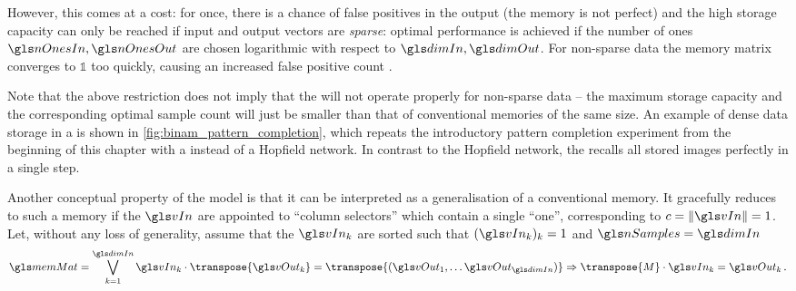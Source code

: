 However, this comes at a cost: for once, there is a chance of false positives in the output (the memory is not perfect) and the high storage capacity can only be reached if input and output vectors are \emph{sparse}: optimal performance is achieved if the number of ones $\nOnesIn, \nOnesOut$ are chosen logarithmic with respect to $\dimIn, \dimOut$. For non-sparse data the memory matrix \memMat converges to $\mathbb{1}$ too quickly, causing an increased false positive count \nFPk.

Note that the above restriction does not imply that the \BiNAM will not operate properly for non-sparse data -- the maximum storage capacity and the corresponding optimal sample count will just be smaller than that of conventional memories of the same size. An example of dense data storage in a \BiNAM is shown in \cref{fig:binam_pattern_completion}, which repeats the introductory pattern completion experiment from the beginning of this chapter with a \BiNAM instead of a Hopfield network. In contrast to the Hopfield network, the \BiNAM recalls all stored images perfectly in a single step.

Another conceptual property of the \BiNAM model is that it can be interpreted as a generalisation of a conventional memory. It gracefully reduces to such a memory if the $\vIn$  are appointed to \enquote{column selectors} which contain a single \enquote{one}, corresponding to $c = \|\vIn\| = 1$. Let, without any loss of generality, assume that the $\vIn_k$ are sorted such that $(\vIn_k)_k = 1$ and $\nSamples = \dimIn$
\begin{align}
	\memMat = \bigvee_{k = 1}^{\dimIn} \vIn_k \cdot \transpose{\vOut_k} = \transpose{(\vOut_1, \ldots \vOut_{\dimIn})} \Rightarrow \transpose{M} \cdot \vIn_k = \vOut_k \,.
\end{align}

